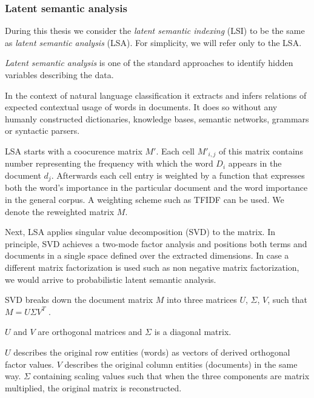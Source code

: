     
    \subsubsection{Latent semantic analysis}
    
    During this thesis we consider the \emph{latent semantic indexing} (LSI) to be the same as \emph{latent semantic analysis} (LSA).
    For simplicity, we will refer only to the LSA.
    
    \emph{Latent semantic analysis} is one of the standard approaches to identify hidden variables describing the data.
    
    In the context of natural language classification it extracts and infers relations of expected contextual usage of words in documents.
    It does so without any humanly constructed dictionaries, knowledge bases, semantic networks, grammars or syntactic parsers.
    
    LSA starts with a coocurence matrix $M'$. 
    Each cell $M'_{i,j}$ of this matrix contains number representing the frequency with  which  the  word $D_i$ appears in the document $d_j$.
    Afterwards each cell entry is weighted by a function that expresses both the word's importance in the particular document and the word importance in the general corpus.
    A weighting scheme such as TFIDF can be used.
    We denote the reweighted matrix $M$. 
    
    Next, LSA applies singular value decomposition (SVD) to the matrix.
    In principle, SVD achieves a two-mode factor analysis and positions both terms and documents in a single space defined over the extracted dimensions.
    In case a different matrix factorization is used such as non negative matrix factorization, we would arrive to probabilistic latent semantic analysis.
    
    SVD breaks down the document matrix $M$ into three matrices $U$, $\Sigma$, $V$, 
    such that $M=U \Sigma V^T$ \cite{papadimitriou2000latent} %
    \cite{deerwester1990indexing} %
    \cite{maas2011learning} %
    \cite{wiemer2004latent} %
    \cite{landauer1998introduction}. %

    $U$ and $V$ are orthogonal matrices and $\Sigma$ is a diagonal matrix.
    
    {}

    $U$ describes the original row entities (words) as vectors of derived orthogonal  factor values. 
    $V$ describes the original column entities (documents) in the same way.
    $\Sigma$ containing scaling values such that when the three components are matrix multiplied, the original matrix is reconstructed.


